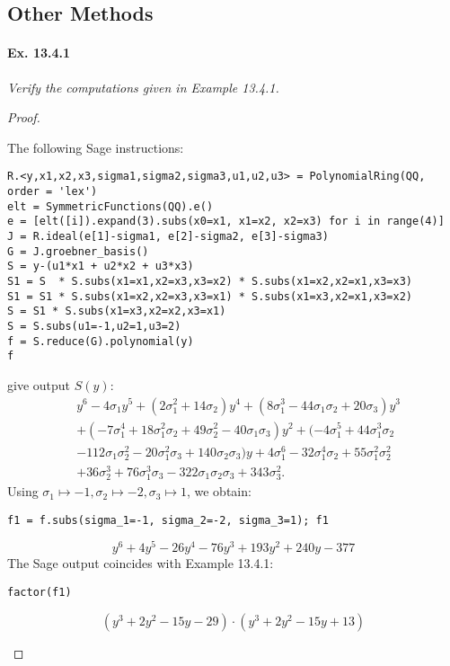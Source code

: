 \documentclass[11pt,a4paper]{article}
\newcommand{\be} {\begin{enumerate}}
\newcommand{\ee} {\end{enumerate}}
\begin{document}
\subsection{Other Methods}

\paragraph{Ex. 13.4.1}

{\it Verify the computations given in Example 13.4.1.
\begin{proof}
\be
The following Sage instructions:
\begin{verbatim}
R.<y,x1,x2,x3,sigma1,sigma2,sigma3,u1,u2,u3> = PolynomialRing(QQ, order = 'lex')
elt = SymmetricFunctions(QQ).e()
e = [elt([i]).expand(3).subs(x0=x1, x1=x2, x2=x3) for i in range(4)]
J = R.ideal(e[1]-sigma1, e[2]-sigma2, e[3]-sigma3)
G = J.groebner_basis()
S = y-(u1*x1 + u2*x2 + u3*x3)
S1 = S  * S.subs(x1=x1,x2=x3,x3=x2) * S.subs(x1=x2,x2=x1,x3=x3)
S1 = S1 * S.subs(x1=x2,x2=x3,x3=x1) * S.subs(x1=x3,x2=x1,x3=x2)
S = S1 * S.subs(x1=x3,x2=x2,x3=x1)
S = S.subs(u1=-1,u2=1,u3=2)
f = S.reduce(G).polynomial(y)
f
\end{verbatim}
give output $S(y)$:
\begin{align*}
& y^{6} - 4\sigma_{1}y^{5} + (2\sigma_{1}^{2} + 14\sigma_{2}) y^{4} + (8 \sigma_{1}^{3} - 44\sigma_{1} \sigma_{2} + 20\sigma_{3}) y^{3} \\
& + (-7\sigma_{1}^{4} + 18 \sigma_{1}^{2} \sigma_{2} + 49 \sigma_{2}^{2} - 40\sigma_{1} \sigma_{3}) y^{2} + (-4 \sigma_{1}^{5} + 44\sigma_{1}^{3} \sigma_{2} \\ & - 112\sigma_{1} \sigma_{2}^{2} - 20\sigma_{1}^{2} \sigma_{3} + 140\sigma_{2} \sigma_{3}) y+4\sigma_{1}^{6}  - 32 \sigma_{1}^{4}\sigma_{2} + 55 \sigma_{1}^{2} \sigma_{2}^{2} \\
& + 36\sigma_{2}^{3} + 76 \sigma_{1}^{3} \sigma_{3} - 322  \sigma_{1} \sigma_{2} \sigma_{3} + 343 \sigma_{3}^{2}. 
\end{align*}
Using $\sigma_1 \mapsto -1,\sigma_2 \mapsto -2,\sigma_3 \mapsto 1$, we obtain:
\begin{verbatim}
f1 = f.subs(sigma_1=-1, sigma_2=-2, sigma_3=1); f1
\end{verbatim}
$$y^{6} + 4 y^{5} - 26 y^{4} - 76 y^{3} + 193 y^{2} + 240 y - 377$$
The Sage output coincides with Example 13.4.1:
\begin{verbatim}
factor(f1)
\end{verbatim}
$$(y^{3} + 2 y^{2} - 15 y - 29) \cdot (y^{3} + 2 y^{2} - 15 y + 13)$$
\ee\end{proof}
}
\end{document}
